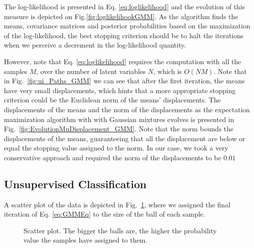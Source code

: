 \documentclass[letterpaper, 10 pt, conference]{ieeeconf}  %
\begin{document}
The log-likelihood is presented in Eq. \ref{eq:loglikelihood} and the evolution of this measure is depicted on Fig.\ref{fig:loglikelihookGMM}. As the algorithm 
finds the means, covariance matrices and posterior probabilities based on the maximization of the log-likelihood, the best stopping criterion should be to
halt the iterations when we perceive a decrement in the log-likelihood quantity.

However, note that Eq. \ref{eq:loglikelihood} requires the computation with all the samples $M$, over the number of latent variables $N$, which is $O(NM)$. 
Note that in Fig.~\ref{fig:ui_Paths_GMM} we can see that after the first iteration, the means have very small displacements, which hints that a more appropriate stopping criterion could be the Euclidean norm of the means' displacements. The displacements of the means and the norm of the displacements as the  expectation maximization algorithm with with Gaussian mixtures evolves is presented in Fig.~\ref{fig:EvolutionMuDisplacement_GMM}. Note that the norm bounds the displacements of the means, guaranteeing that all the displacement are below or equal the stopping value assigned to the norm. In our case, we took a very
conservative approach and required the norm of the displacements to be $0.01$

\subsection{Unsupervised Classification}
\label{sec:Experiment_Unsupervised_Classification}

A scatter plot of the data is depicted in Fig.~\ref{fig:ScatterPlot}, where we assigned the final iteration of Eq. \ref{eq:GMMEq} to the size of the ball of each 
sample.

\begin{figure}[thpb]
      \centering
      \caption{Scatter plot. The bigger the balls are, the higher the probability value the samples have assigned to them.}
      \label{fig:ScatterPlot}
\end{figure}
\end{document}
